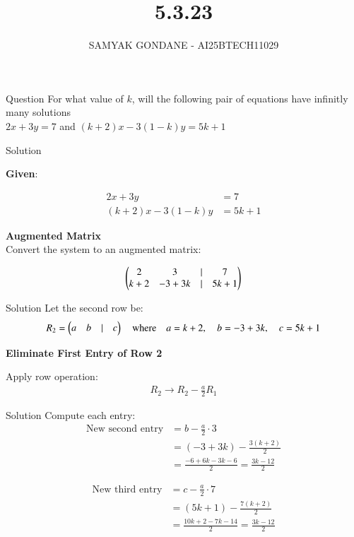 \documentclass{beamer}
\title 
{5.3.23}
\date{}
\author
{SAMYAK GONDANE - AI25BTECH11029}
\begin{document}
\frame{\titlepage}

\begin{frame}{Question}
For what value of $k$, will the following pair of equations have infinitly many solutions\\

$2x + 3y = 7$ and $(k + 2)x - 3(1 - k)y = 5k + 1$
\end{frame}


\begin{frame}{Solution}

\textbf{Given}:

\begin{align}
2x + 3y &= 7 \\
(k + 2)x - 3(1 - k)y &= 5k + 1
\end{align}

\textbf{Augmented Matrix}\\
Convert the system to an augmented matrix:

\begin{align}
\begin{pmatrix}2 & 3 & \vert & 7 \\
k+2 & -3 + 3k & \vert & 5k + 1\end{pmatrix}
\end{align}
\end{frame}


\begin{frame}{Solution}
Let the second row be:
\begin{align}
R_2 = \begin{pmatrix}a & b & \vert & c\end{pmatrix}
\quad \text{where} \quad
a = k+2,\quad b = -3 + 3k,\quad c = 5k + 1
\end{align}


\textbf{Eliminate First Entry of Row 2}

Apply row operation:
\begin{align}
R_2 \rightarrow R_2 - \frac{a}{2} R_1
\end{align}
\end{frame}

\begin{frame}{Solution}
Compute each entry:
\begin{align*}
\text{New second entry} &= b - \frac{a}{2} \cdot 3 \\
&= (-3 + 3k) - \frac{3(k + 2)}{2} \\
&= \frac{-6 + 6k - 3k - 6}{2} = \frac{3k - 12}{2}
\end{align*}


\begin{align*}
\text{New third entry} &= c - \frac{a}{2} \cdot 7 \\
&= (5k + 1) - \frac{7(k + 2)}{2} \\
&= \frac{10k + 2 - 7k - 14}{2} = \frac{3k - 12}{2}
\end{align*}
\end{frame}
\end{document}
